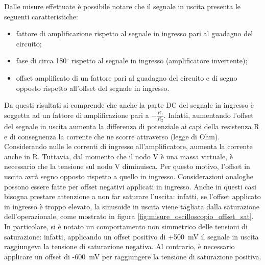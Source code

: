 \noindent
Dalle misure effettuate è possibile notare che il segnale in uscita presenta le seguenti caratteristiche:
\begin{itemize}
	\item fattore di amplificazione rispetto al segnale in ingresso pari al guadagno del circuito;
	\item fase di circa 180$^\circ$ rispetto al segnale in ingresso (amplificatore invertente);
	\item offset amplificato di un fattore pari al guadagno del circuito e di segno opposto rispetto all'offset del segnale in ingresso.
\end{itemize}
Da questi risultati si comprende che anche la parte DC del segnale in ingresso è soggetta ad un fattore di amplificazione pari a $-\frac{R_1}{R_2}$. Infatti, aumentando l'offset del segnale in uscita aumenta la differenza di potenziale ai capi della resistenza R e di conseguenza la corrente che ne scorre attraverso (legge di Ohm). Considerando nulle le correnti di ingresso all'amplificatore, aumenta la corrente anche in R. Tuttavia, dal momento che il nodo V\super{-} è una massa virtuale, è necessario che la tensione sul nodo V diminuisca. Per questo motivo, l'offset in uscita avrà segno opposto rispetto a quello in ingresso. Considerazioni analoghe possono essere fatte per offset negativi applicati in ingresso.
Anche in questi casi bisogna prestare attenzione a non far saturare l'uscita: infatti, se l'offset applicato in ingresso è troppo elevato, la sinusoide in uscita viene tagliata dalla saturazione dell'operazionale, come mostrato in figura \ref{fig:misure_oscilloscopio_offset_sat}. In particolare, si è notato un comportamento non simmetrico delle tensioni di saturazione: infatti, applicando un offset positivo di +\SI{500}{\milli\volt} il segnale in uscita raggiungeva la tensione di saturazione negativa. Al contrario, è necessario applicare un offset di -\SI{600}{\milli\volt} per raggiungere la tensione di saturazione positiva.

